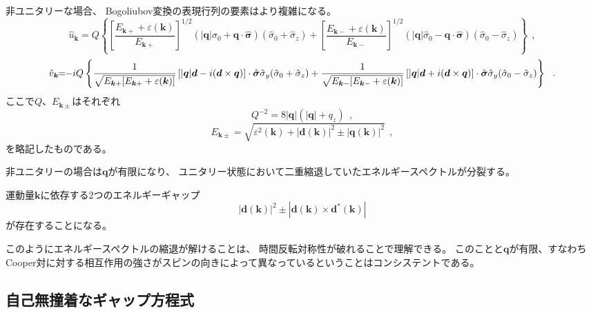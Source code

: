 \documentclass[uplatex,a4j,12pt,dvipdfmx]{jsarticle}
\begin{document}
非ユニタリーな場合、
Bogoliubov変換の表現行列の要素はより複雑になる。
\[
	\hat{u}_{\bm{k}}
	\!\!
	=
	\!\!
	Q
	\left\{
	\left[
		\dfrac{ E_{\bm{k} + } + \varepsilon(\bm{k}) }
		{ E_{\bm{k} + } }
		\right]^{1/2}
	(
	| \bm{q} | \hat{\sigma}_{0} + \bm{q} \cdot \hat{\bm{\sigma}}
	)
	(
	\hat{\sigma}_{0} + \hat{\sigma}_{z}
	)
	+
	\left[
		\dfrac{ E_{\bm{k} - } + \varepsilon(\bm{k}) }
		{ E_{\bm{k} - } }
		\right]^{1/2}
	(
	| \bm{q} | \hat{\sigma}_{0} - \bm{q} \cdot \hat{\bm{\sigma}}
	)
	(
	\hat{\sigma}_{0} - \hat{\sigma}_{z}
	)
	\right\}
	\ \ ,
\]\[
	\hat{v}_{\bm{k}}
	\!\!
	=
	\!\!
	- i Q
	\left\{
	\dfrac{1}{\sqrt{ E_{\bm{k} +} [ E_{\bm{k} +} + \varepsilon(\bm{k}) ] }}
	\left[
		| \bm{q} | \bm{d} - i ( \bm{d} \times \bm{q} )
		\right]
	\cdot
	\hat{\bm{\sigma}}
	\hat{\sigma}_{y}
	(
	\hat{\sigma}_{0} + \hat{\sigma}_{z}
	)
	+
	\dfrac{1}{\sqrt{ E_{\bm{k} -} [ E_{\bm{k} -} + \varepsilon(\bm{k}) ] }}
	\left[
		| \bm{q} | \bm{d} + i ( \bm{d} \times \bm{q} )
		\right]
	\cdot
	\hat{\bm{\sigma}}
	\hat{\sigma}_{y}
	(
	\hat{\sigma}_{0} - \hat{\sigma}_{z}
	)
	\right\}
	\ \ .
	\\
\]
ここで$Q$、$E_{\bm{k} \pm}$はそれぞれ
\[
	Q^{-2}
	=
	8 | \bm{q} | ( | \bm{q} | + q_{z} )
	\ \ ,
\]\[
	E_{\bm{k} \pm}
	=
	\sqrt{ \varepsilon^{2}(\bm{k}) + | \bm{d}(\bm{k}) |^{2} \pm | \bm{q}(\bm{k}) |^{2} }
	\ \ ,
\]
を略記したものである。

非ユニタリーの場合は$\bm{q}$が有限になり、
ユニタリー状態において二重縮退していたエネルギースペクトルが分裂する。

運動量$\bm{k}$に依存する2つのエネルギーギャップ
\[
	| \bm{d}(\bm{k}) |^{2} \pm | \bm{d}(\bm{k}) \times \bm{d}^{*}(\bm{k}) |
\]
が存在することになる。

このようにエネルギースペクトルの縮退が解けることは、
時間反転対称性が破れることで理解できる。
このことと$\bm{q}$が有限、すなわちCooper対に対する相互作用の強さがスピンの向きによって異なっているということはコンシステントである。
\subsection{自己無撞着なギャップ方程式}
\end{document}

